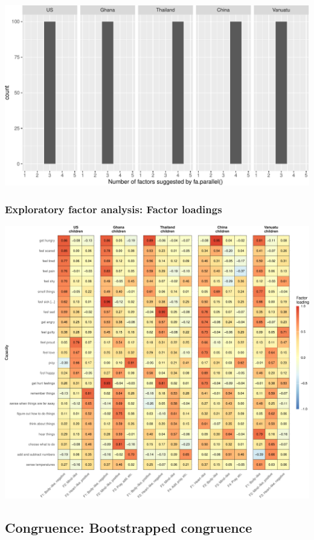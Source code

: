 \documentclass[
  man]{apa6}
\begin{document}
\includegraphics{Script_Re_Weisman_2021_Group1_2024_files/figure-latex/parallel dist children-1.pdf}

\hypertarget{exploratory-factor-analysis-factor-loadings-1}{%
\subsubsection{Exploratory factor analysis: Factor loadings}\label{exploratory-factor-analysis-factor-loadings-1}}

\includegraphics{Script_Re_Weisman_2021_Group1_2024_files/figure-latex/heatmap children-1.pdf}

\hypertarget{congruence-bootstrapped-congruence}{%
\subsection{Congruence: Bootstrapped congruence}\label{congruence-bootstrapped-congruence}}
\end{document}
